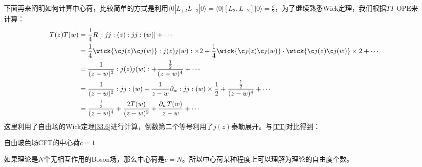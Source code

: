 下面再来阐明如何计算中心荷，比较简单的方式是利用$\langle0|L_{+2}L_{-2}|0\rangle=\langle0|[L_2,L_{-2}]|0\rangle=\frac c2$，为了继续熟悉Wick定理，我们根据$TT$ OPE来计算：
\begin{equation}
	\begin{aligned}
		T(z)T(w)&=\frac{1}{4}R\left[:jj:(z):jj:(w)\right]+\cdots\\
		&=\frac{1}{4}\wick{\c j(z)\c j(w)}:j(z)j(w):\times 2+\frac{1}{4}\wick{\c j(z)\c j(w)}\cdot\wick{\c j(z)\c j(w)}\times 2+\cdots\\
		&=\frac{1}{(z-w)^2}:j(z)j(w):+\frac{\frac{1}{2}}{(z-w)^4}+\cdots\\
		&=\frac{1}{(z-w)^2}:jj:(w)+\frac{1}{z-w}\partial_w :jj:(w)\times\frac{1}{2}+\frac{\frac{1}{2}}{(z-w)^4}+\cdots\\
		&=\frac{\frac{1}{2}}{(z-w)^4}+\frac{2T(w)}{(z-w)^2}+\frac{\partial_w T(w)}{z-w}+\cdots
	\end{aligned}
\end{equation}
这里利用了自由场的Wick定理\ref{33.6}进行计算，倒数第二个等号利用了$j(z)$泰勒展开。与\ref{TT}对比得到：
\begin{theorem}
	自由玻色场CFT的中心荷$\boxed{c=1}$
\end{theorem}
如果理论是$N$个无相互作用的Boson场，那么中心荷是$c=N$。所以中心荷某种程度上可以理解为理论的自由度个数。
